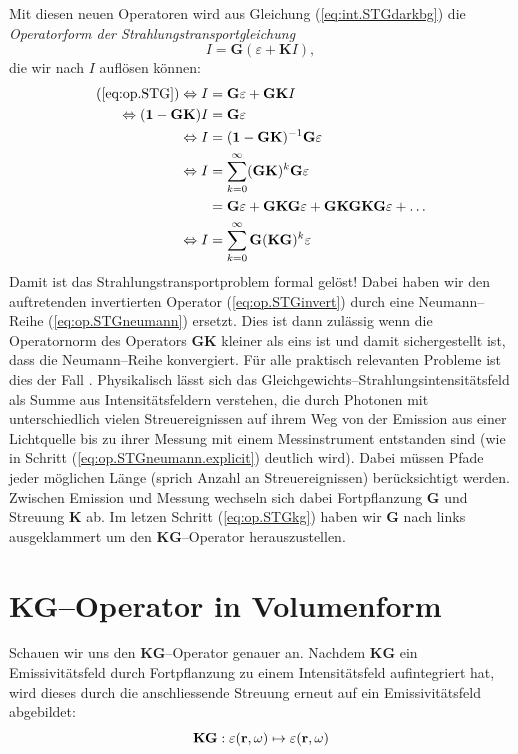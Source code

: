 	Mit diesen neuen Operatoren wird aus Gleichung (\ref{eq:int.STGdarkbg}) die {\em Operatorform der Strahlungstransportgleichung}
	\begin{equation}
		I=\mathbf{G}(\varepsilon + \mathbf{K}I),
		\label{eq:op.STG}
	\end{equation}
	die wir nach $I$ auflösen können:
	\begin{align}
		(\ref{eq:op.STG}) \Leftrightarrow I&=\mathbf{G}\varepsilon + \mathbf{GK}I \nonumber \\
		\Leftrightarrow (\mathbf{1}-\mathbf{GK})I &= \mathbf{G}\varepsilon \nonumber \\
		\Leftrightarrow I &= (\mathbf{1}-\mathbf{GK})^{-1}\mathbf{G}\varepsilon \label{eq:op.STGinvert} \\
		\Leftrightarrow I &= \sum_{k=0}^\infty (\mathbf{GK})^k \mathbf{G}\varepsilon \label{eq:op.STGneumann} \\
		&=\mathbf{G}\varepsilon + \mathbf{GKG}\varepsilon + \mathbf{GKGKG}\varepsilon + \hdots \label{eq:op.STGneumann.explicit} \\
		\Leftrightarrow I &=\sum_{k=0}^\infty \mathbf{G} (\mathbf{KG})^k \varepsilon \label{eq:op.STGkg}
	\end{align}
	Damit ist das Strahlungstransportproblem formal gelöst! Dabei haben wir den auftretenden invertierten Operator (\ref{eq:op.STGinvert}) durch eine Neumann--Reihe (\ref{eq:op.STGneumann}) ersetzt. Dies ist dann zulässig wenn die Operatornorm des Operators $\mathbf{GK}$ kleiner als eins ist und damit sichergestellt ist, dass die Neumann--Reihe konvergiert. Für alle praktisch relevanten Probleme ist dies der Fall \citep[siehe][Theorem 12 und 13]{Arvo:1995p9257}. Physikalisch lässt sich das Gleichgewichts--Strahlungsintensitätsfeld als Summe aus Intensitätsfeldern verstehen, die durch Photonen mit unterschiedlich vielen Streuereignissen auf ihrem Weg von der Emission aus einer Lichtquelle bis zu ihrer Messung mit einem Messinstrument entstanden sind (wie in Schritt (\ref{eq:op.STGneumann.explicit}) deutlich wird). Dabei müssen Pfade jeder möglichen Länge (sprich Anzahl an Streuereignissen) berücksichtigt werden. Zwischen Emission und Messung wechseln sich dabei Fortpflanzung $\mathbf{G}$ und Streuung $\mathbf{K}$ ab. Im letzen Schritt (\ref{eq:op.STGkg}) haben wir $\mathbf{G}$ nach links ausgeklammert um den $\mathbf{KG}$--Operator herauszustellen.
	
	
	\section{KG--Operator in Volumenform}
	Schauen wir uns den $\mathbf{KG}$--Operator genauer an. Nachdem $\mathbf{KG}$ ein Emissivitätsfeld durch Fortpflanzung zu einem Intensitätsfeld aufintegriert hat, wird dieses durch die anschliessende Streuung erneut auf ein Emissivitätsfeld abgebildet:
	\begin{equation*}
		\mathbf{KG} : \varepsilon(\mathbf{r},\omega) \mapsto \varepsilon(\mathbf{r},\omega)
	\end{equation*}

